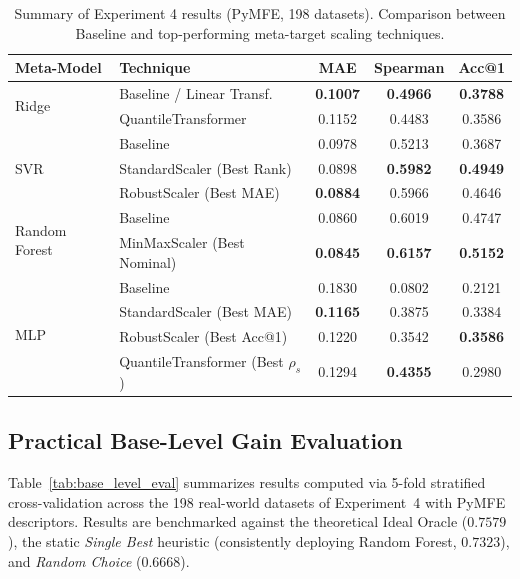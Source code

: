 \documentclass[12pt]{article}
\begin{document}
\begin{table}[ht]
\centering
\caption{Summary of Experiment 4 results (PyMFE, 198 datasets). Comparison between Baseline and top-performing meta-target scaling techniques.}
\label{tab:results_exp4_summary}
\footnotesize
\begin{tabular}{llccc}
\toprule
\textbf{Meta-Model} & \textbf{Technique} & \textbf{MAE} & \textbf{Spearman} & \textbf{Acc@1} \\
\midrule
\multirow{2}{*}{Ridge}
 & Baseline / Linear Transf. & \textbf{0.1007} & \textbf{0.4966} & \textbf{0.3788} \\
 & QuantileTransformer         & 0.1152          & 0.4483          & 0.3586          \\
\midrule
\multirow{3}{*}{SVR}
 & Baseline                    & 0.0978          & 0.5213          & 0.3687          \\
 & StandardScaler (Best Rank) & 0.0898          & \textbf{0.5982} & \textbf{0.4949} \\
 & RobustScaler (Best MAE)    & \textbf{0.0884} & 0.5966          & 0.4646          \\
\midrule
\multirow{2}{*}{Random Forest}
 & Baseline                    & 0.0860          & 0.6019          & 0.4747          \\
 & MinMaxScaler (Best Nominal) & \textbf{0.0845} & \textbf{0.6157} & \textbf{0.5152} \\
\midrule
\multirow{4}{*}{MLP}
 & Baseline                    & 0.1830          & 0.0802          & 0.2121          \\
 & StandardScaler (Best MAE)  & \textbf{0.1165} & 0.3875          & 0.3384          \\
 & RobustScaler (Best Acc@1)  & 0.1220          & 0.3542          & \textbf{0.3586} \\
 & QuantileTransformer (Best $\rho_s$) & 0.1294 & \textbf{0.4355} & 0.2980          \\
\bottomrule
\end{tabular}
\end{table}

\subsection{Practical Base-Level Gain Evaluation}
\label{subsec:nivel_base}

Table~\ref{tab:base_level_eval} summarizes results computed via 5-fold stratified cross-validation across the 198 real-world datasets of Experiment~4 with PyMFE descriptors. Results are benchmarked against the theoretical Ideal Oracle ($0.7579$), the static \textit{Single Best} heuristic (consistently deploying Random Forest, $0.7323$), and \textit{Random Choice} ($0.6668$).
\end{document}
